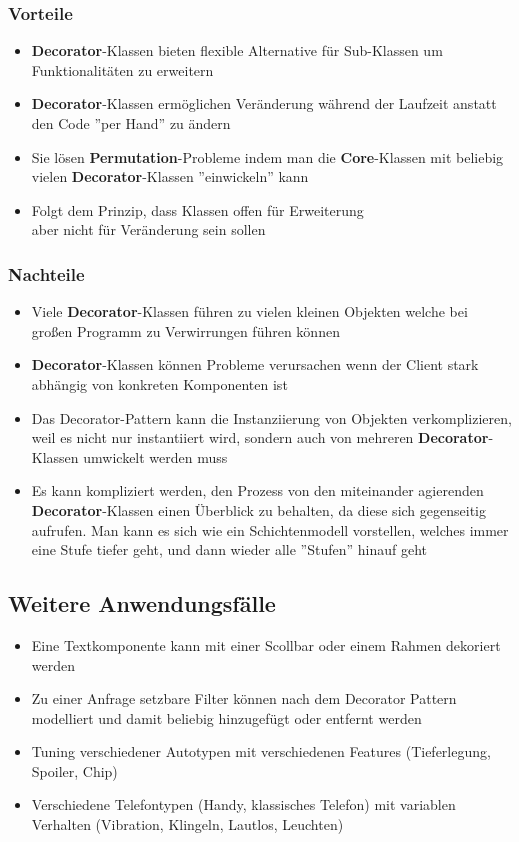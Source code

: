 \subsubsection{Vorteile}
\begin{itemize}
	\item \textbf{Decorator}-Klassen bieten flexible Alternative für Sub-Klassen um Funktionalitäten zu erweitern
	\item \textbf{Decorator}-Klassen ermöglichen Veränderung während der Laufzeit anstatt den Code ''per Hand'' zu ändern
	\item Sie lösen \textbf{Permutation}-Probleme indem man die \textbf{Core}-Klassen mit beliebig vielen \textbf{Decorator}-Klassen ''einwickeln'' kann
	\item Folgt dem Prinzip, dass Klassen offen für Erweiterung\\ aber nicht für Veränderung sein sollen
\end{itemize}

\subsubsection{Nachteile}
\begin{itemize}
	\item Viele \textbf{Decorator}-Klassen führen zu vielen kleinen Objekten welche bei großen Programm zu Verwirrungen führen können
	\item \textbf{Decorator}-Klassen können Probleme verursachen wenn der Client stark abhängig von konkreten Komponenten ist
	\item Das Decorator-Pattern kann die Instanziierung von Objekten verkomplizieren, weil es nicht nur instantiiert wird, sondern auch von mehreren \textbf{Decorator}-Klassen umwickelt werden muss
	\item Es kann kompliziert werden, den Prozess von den miteinander agierenden \textbf{Decorator}-Klassen einen Überblick zu behalten, da diese sich gegenseitig aufrufen. Man kann es sich wie ein Schichtenmodell vorstellen, welches immer eine Stufe tiefer geht, und dann wieder alle ''Stufen'' hinauf geht
\end{itemize}

\subsection{Weitere Anwendungsfälle}
\cite{PhilippHauera}

\begin{itemize}
	\item Eine Textkomponente kann mit einer Scollbar oder einem Rahmen dekoriert werden
	\item Zu einer Anfrage setzbare Filter können nach dem Decorator Pattern modelliert und damit beliebig hinzugefügt oder entfernt werden
	\item Tuning verschiedener Autotypen mit verschiedenen Features (Tieferlegung, Spoiler, Chip) 
	\item Verschiedene Telefontypen (Handy, klassisches Telefon) mit variablen Verhalten (Vibration, Klingeln, Lautlos, Leuchten) 
\end{itemize}

